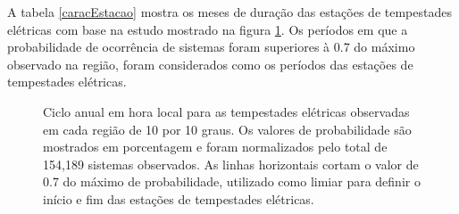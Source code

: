 A tabela \ref{caracEstacao} mostra os meses de duração das estações de tempestades elétricas com base na estudo mostrado na figura \ref{anual}. Os períodos em que a probabilidade de ocorrência de sistemas foram superiores à 0.7 do máximo observado na região, foram considerados como os períodos das estações de tempestades elétricas. %


\begin{figure}[!ht]
\caption{Ciclo anual em hora local para as tempestades elétricas observadas em cada região de 10 por 10 graus. Os valores de probabilidade são mostrados em porcentagem e foram normalizados pelo total de 154,189 sistemas observados. As linhas horizontais cortam o valor de 0.7 do máximo de probabilidade, utilizado como limiar para definir o início e fim das estações de tempestades elétricas.}
\label{anual}
\end{figure}



